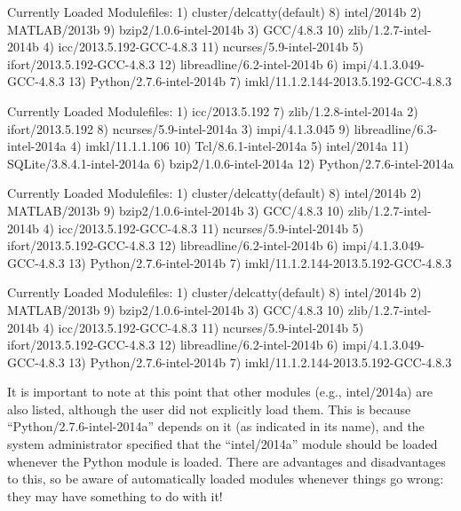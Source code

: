 \ifantwerpen
\begin{prompt}
Currently Loaded Modulefiles:
  1) cluster/delcatty(default)              8) intel/2014b
  2) MATLAB/2013b                           9) bzip2/1.0.6-intel-2014b
  3) GCC/4.8.3                             10) zlib/1.2.7-intel-2014b
  4) icc/2013.5.192-GCC-4.8.3              11) ncurses/5.9-intel-2014b
  5) ifort/2013.5.192-GCC-4.8.3            12) libreadline/6.2-intel-2014b
  6) impi/4.1.3.049-GCC-4.8.3              13) Python/2.7.6-intel-2014b
  7) imkl/11.1.2.144-2013.5.192-GCC-4.8.3
\end{prompt}
\fi
\ifleuven
\begin{prompt}
Currently Loaded Modulefiles:
  1) icc/2013.5.192                7) zlib/1.2.8-intel-2014a
  2) ifort/2013.5.192              8) ncurses/5.9-intel-2014a
  3) impi/4.1.3.045                9) libreadline/6.3-intel-2014a
  4) imkl/11.1.1.106              10) Tcl/8.6.1-intel-2014a
  5) intel/2014a                  11) SQLite/3.8.4.1-intel-2014a
  6) bzip2/1.0.6-intel-2014a      12) Python/2.7.6-intel-2014a
\end{prompt}
\fi
\ifgent
\begin{prompt}
Currently Loaded Modulefiles:
  1) cluster/delcatty(default)              8) intel/2014b
  2) MATLAB/2013b                           9) bzip2/1.0.6-intel-2014b
  3) GCC/4.8.3                             10) zlib/1.2.7-intel-2014b
  4) icc/2013.5.192-GCC-4.8.3              11) ncurses/5.9-intel-2014b
  5) ifort/2013.5.192-GCC-4.8.3            12) libreadline/6.2-intel-2014b
  6) impi/4.1.3.049-GCC-4.8.3              13) Python/2.7.6-intel-2014b
  7) imkl/11.1.2.144-2013.5.192-GCC-4.8.3
\end{prompt}
\fi
\ifbrussel
\begin{prompt}
Currently Loaded Modulefiles:
  1) cluster/delcatty(default)              8) intel/2014b
  2) MATLAB/2013b                           9) bzip2/1.0.6-intel-2014b
  3) GCC/4.8.3                             10) zlib/1.2.7-intel-2014b
  4) icc/2013.5.192-GCC-4.8.3              11) ncurses/5.9-intel-2014b
  5) ifort/2013.5.192-GCC-4.8.3            12) libreadline/6.2-intel-2014b
  6) impi/4.1.3.049-GCC-4.8.3              13) Python/2.7.6-intel-2014b
  7) imkl/11.1.2.144-2013.5.192-GCC-4.8.3
\end{prompt}
\fi


It is important to note at this point that other modules (e.g., intel/2014a)
are also listed, although the user did not explicitly load them. This is
because ``Python/2.7.6-intel-2014a'' depends on it (as indicated in its name),
and the system administrator specified that the ``intel/2014a'' module should
be loaded whenever the Python module is loaded. There are advantages and
disadvantages to this, so be aware of automatically loaded modules whenever
things go wrong: they may have something to do with it!

